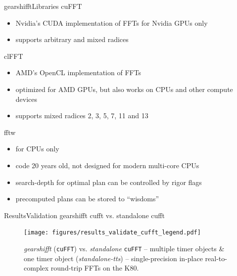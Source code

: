 \documentclass[t,11pt,hyperref={
  pdftitle = {gearshifft},
  pdfsubject = {gearshifft},
  pdfborder={0 0 0},
  colorlinks=true,
  urlcolor=red,
  citecolor=red,
  linkcolor=red,
  pdfauthor={Peter Steinbach, Matthias Werner}
  }
]{beamer}
\newcommand{\cufft}{\texttt{cuFFT}}
\begin{document}
\begin{frame}{gearshifft}{Libraries}
  cuFFT 
  \begin{itemize}
  \item Nvidia's CUDA implementation of FFTs for Nvidia GPUs only
  \item supports arbitrary and mixed radices
  \end{itemize}

  clFFT
  \begin{itemize}
  \item AMD's OpenCL implementation of FFTs
  \item optimized for AMD GPUs, but also works on CPUs and other compute devices
  \item supports mixed radices 2, 3, 5, 7, 11 and 13
  \end{itemize}

  fftw
  \begin{itemize}
  \item for CPUs only
  \item code 20 years old, not designed for modern multi-core CPUs
  \item search-depth for optimal plan can be controlled by rigor flags
  \item precomputed plans can be stored to ``wisdoms''
  \end{itemize}
  
\end{frame}




\begin{frame}{Results}{Validation gearshifft cufft vs. standalone cufft}
\begin{figure}[!htb]
  \centering
  \texttt{[image: figures/results\_validate\_cufft\_legend.pdf]}\\[-.5em]
  \hfill
  \caption{\textit{gearshifft} (\cufft{}) vs. \textit{standalone} \cufft{} --  multiple timer objects \& one timer object (\textit{standalone-tts}) -- single-precision in-place real-to-complex round-trip FFTs on the K80.}
  \label{fig:verify_cufft}
\end{figure}
\end{frame}
\end{document}
